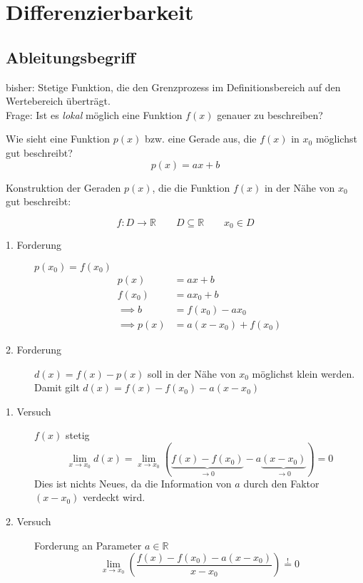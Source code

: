 \section{Differenzierbarkeit}
\subsection{Ableitungsbegriff}

bisher: Stetige Funktion, die den Grenzprozess im Definitionsbereich auf den Wertebereich überträgt.\\
Frage: Ist es \emph{lokal} möglich eine Funktion \( f(x) \) genauer zu beschreiben? 

Wie sieht eine Funktion \( p(x) \) bzw. eine Gerade aus, die \( f(x) \) in \( x_0 \) möglichst gut beschreibt?
\[
p(x)=ax+b 
\]
\begin{center}
  \centering
{}
  \label{fig:Approximierung}
\end{center}

\noindent Konstruktion der Geraden \( p(x) \), die die Funktion \( f(x) \) in der Nähe von \( x_0 \) gut beschreibt:

\[
	f:D\rightarrow\mathbb{R} \qquad D\subseteq\mathbb{R} \qquad x_0 \in D
\]

\begin{description}
	\item[1. Forderung] \( p(x_0)=f(x_0) \) 
	\begin{align*}
			p(x) &= ax+b \\
			f(x_0) &= ax_0+b \\
			\implies b &= f(x_0)-ax_0 \\
			\implies p(x) &= a(x-x_0)+f(x_0)
	\end{align*}
	\item[2. Forderung] \( d(x)=f(x)-p(x) \) soll in der Nähe von \( x_0 \) möglichst klein werden. Damit gilt \( d(x) = f(x) -f(x_0)-a(x-x_0) \)
	\item[1. Versuch] \( f(x) \) stetig  
	\[\lim_{x\rightarrow x_0} d(x)=\lim_{x\rightarrow x_0}(\underbrace{f(x)-f(x_0)}_{\rightarrow 0}-a\underbrace{(x-x_0)}_{\rightarrow 0})=0\]Dies ist nichts Neues, da die Information von \( a \) durch den Faktor \( (x-x_0) \) verdeckt wird.
	\item[2. Versuch] Forderung an Parameter \( a \in \mathbb{R} \)
	\[
		\lim_{x\rightarrow x_0}\left(\frac{f(x)-f(x_0)-a(x-x_0)}{x-x_0}\right)\stackrel{!}{=}0
	\]
\end{description}

